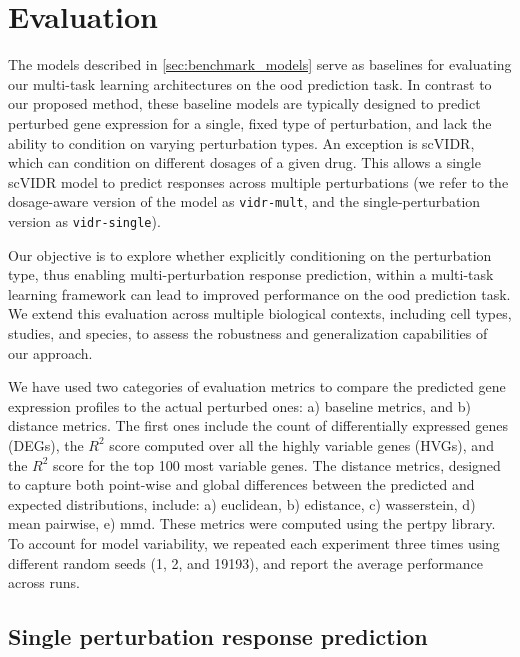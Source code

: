 \documentclass[12pt, a4paper]{article}
\begin{document}
\section{Evaluation}




The models described in \cref{sec:benchmark_models} serve as baselines for evaluating our multi-task learning architectures on the \gls{ood} prediction task.
In contrast to our proposed method, these baseline models are typically designed to predict perturbed gene expression for a single, fixed type of perturbation, and lack the ability to condition on varying perturbation types. An exception is scVIDR, which can condition on different dosages of a given drug. This allows a single scVIDR model to predict responses across multiple perturbations
(we refer to the dosage-aware version of the model as \verb|vidr-mult|, and the single-perturbation version as \verb|vidr-single|).

Our objective is to explore whether explicitly conditioning on the perturbation type, thus enabling multi-perturbation response prediction, within a multi-task learning framework can lead to improved performance on the \gls{ood} prediction task.
We extend this evaluation across multiple biological contexts, including cell types, studies, and species, to assess the robustness and generalization capabilities of our approach.

We have used two categories of evaluation metrics to compare the predicted gene expression profiles to the actual perturbed ones: a) baseline metrics, and b) distance metrics. The first ones include the count of differentially expressed genes (DEGs), the $R^2$ score computed over all the highly variable genes (HVGs), and the $R^2$ score for the top 100 most variable genes. The distance metrics, designed to capture both point-wise and global differences between the predicted and expected distributions, include: a) euclidean, b) edistance, c) wasserstein, d) mean pairwise, e) mmd. These metrics were computed using the pertpy \cite{heumos2024pertpy} library.
To account for model variability, we repeated each experiment three times using different random seeds (1, 2, and 19193), and report the average performance across runs.

\subsection{Single perturbation response prediction}
\label{sec:eval_single_perturbation}
\end{document}
